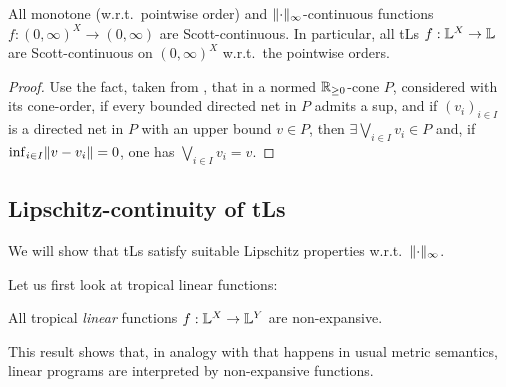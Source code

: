 \begin{theorem}\label{thm:ScottCont}
 All monotone (w.r.t.\ pointwise order) and $\lVert\cdot\rVert_{\infty}$-continuous functions $f:(0,\infty)^X\to (0,\infty)$ are Scott-continuous.
 In particular, all tLs $f:\mathbb{L}^X\to\mathbb{L}$ are Scott-continuous on $(0,\infty)^X$ w.r.t.\ the pointwise orders.
\end{theorem}
\begin{proof}
 Use the fact, taken from \cite{Selinger2004}, that in a normed $\mathbb{R}_{\geq 0}$-cone $P$, considered with its cone-order, if every bounded directed net in $P$ admits a sup, and if $(v_i)_{i\in I}$ is a directed net in $P$ with an upper bound $v\in P$, then $\exists\bigvee_{i\in I} v_i \in P$ and, if $\inf_{i\in I} \lVert v-v_i\rVert =0$, one has $\bigvee_{i\in I} v_i = v$.
\end{proof}



\subsection{Lipschitz-continuity of tLs}\label{sec:4C}%


We will show that tLs satisfy suitable Lipschitz properties w.r.t.\ $\lVert\cdot\rVert_\infty$. 

Let us first look at tropical linear functions:


\begin{proposition}\label{prop:troplinear}
All tropical \emph{linear} functions $f: \mathbb{L}^{X}\to \mathbb{L}^{Y}$ are non-expansive.  
\end{proposition}
This result shows that, in analogy with that happens in usual metric semantics, linear programs are interpreted by non-expansive functions. 

